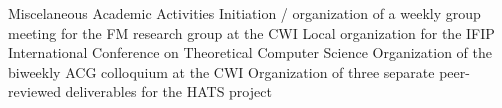 
\begin{rubric}{Miscelaneous Academic Activities}
		Initiation / organization of a weekly group meeting for the FM research group at the CWI
		Local organization for the  IFIP International Conference on Theoretical Computer Science
		Organization of the biweekly ACG colloquium at the CWI
		Organization of three separate peer-reviewed deliverables for the HATS project
\end{rubric}


